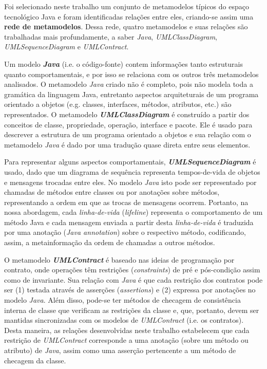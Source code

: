 \documentclass[cic,resumo-unibral]{iiufrgs}
\begin{document}
\begin{extendedsummary}
Foi selecionado neste trabalho um conjunto de metamodelos típicos do espaço tecnológico Java e foram identificadas relações entre eles, criando-se assim uma \textbf{rede de metamodelos}. Dessa rede, quatro metamodelos e suas relações são trabalhadas mais profundamente, a saber \textit{Java}, \textit{UMLClassDiagram}, \textit{UMLSequenceDiagram} e \textit{UMLContract}.

Um modelo \textbf{\textit{Java}} (i.e. o código-fonte) contem informações tanto estruturais quanto comportamentais, e por isso se relaciona com os outros três metamodelos analisados. O metamodelo \textit{Java} criado não é completo, pois não modela toda a gramática da linguagem Java, entretanto aspectos arquiteturais de um programa orientado a objetos (e.g. classes, interfaces, métodos, atributos, etc.) são representados. O metamodelo \textbf{\textit{UMLClassDiagram}} é construído a partir dos conceitos de classe, propriedade, operação, interface e pacote. Ele é usado para descrever a estrutura de um programa orientado a objetos e sua relação com o metamodelo \textit{Java} é dado por uma tradução quase direta entre seus elementos.

Para representar alguns aspectos comportamentais, \textbf{ \textit{UMLSequenceDiagram}} é usado, dado que um diagrama de sequência representa tempos-de-vida de objetos e mensagens trocadas entre eles. No modelo \textit{Java} isto pode ser representado por chamadas de métodos entre classes ou por anotações sobre métodos, representando a ordem em que as trocas de mensagens ocorrem. Portanto, na nossa abordagem, cada \textit{linha-de-vida} (\textit{lifeline}) representa o comportamento de um método Java e cada mensagem enviada a partir desta \textit{linha-de-vida} é traduzida por uma anotação (\textit{Java annotation}) sobre o respectivo método, codificando, assim, a metainformação da ordem de chamadas a outros métodos.

O metamodelo \textbf{\textit{UMLContract}} é baseado nas ideias de programação por contrato, onde operações têm restrições (\textit{constraints}) de pré e pós-condição assim como de invariante. Sua relação com \textit{Java} é que cada restrição dos contratos pode ser (1) testada através de asserções (\textit{assertions}) e (2) expressa por anotações no modelo \textit{Java}. Além disso, pode-se ter métodos de checagem de consistência interna de classe que verificam as restrições da classe e, que, portanto, devem ser mantidas sincronizadas com os modelos de \textit{UMLContract} (i.e. os contratos). Desta maneira, as relações desenvolvidas neste trabalho estabelecem que cada restrição de \textit{UMLContract} corresponde a uma anotação (sobre um método ou atributo) de \textit{Java}, assim como uma asserção pertencente a um método de checagem da classe.


\end{extendedsummary}
\end{document}
